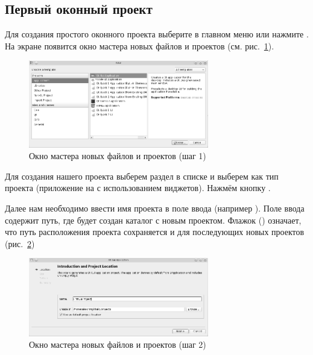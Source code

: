 \subsection[Первый оконный проект]{Первый оконный проект}

Для создания простого оконного проекта выберите в главном меню 
 или нажмите 
. На экране появится окно мастера новых файлов и проектов (см. рис.~\ref{ch11:refDrawing2}).

\begin{figure}[htb]
\begin{center}
\includegraphics[width=0.7\textwidth]{img/ris_11_3}
\caption{Окно мастера новых файлов и проектов (шаг 1)}
\label{ch11:refDrawing2}
\end{center}
\end{figure}

Для создания нашего проекта выберем раздел  в списке
 и выберем  как тип проекта 
(приложение на  с использованием виджетов). Нажмём кнопку .

Далее нам необходимо ввести имя проекта в поле ввода  (например
). Поле ввода  содержит путь, где
будет создан каталог с новым проектом. Флажок 
()
означает, что путь расположения проекта сохраняется и для последующих новых проектов (рис.~\ref{ch11:refDrawing3})

\begin{figure}[htb]
\begin{center}
\includegraphics[width=0.7\textwidth]{img/ris_11_4}
\caption{Окно мастера новых файлов и проектов (шаг 2)}
\label{ch11:refDrawing3}
\end{center}
\end{figure}

